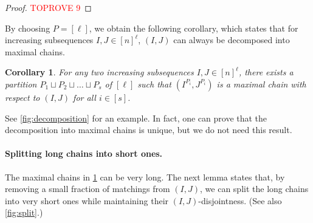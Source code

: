 \documentclass[11pt]{article}
\theoremstyle{plain}
\newtheorem{cor}[thm]{Corollary}
\theoremstyle{definition}
\theoremstyle{remark}
\begin{document}
\begin{proof}\textcolor{red}{TOPROVE 9}\end{proof}

By choosing $P=[\ell]$, we obtain the following corollary, which states that for increasing subsequences $I,J\in [n]^\ell$, $(I,J)$ can always be decomposed into maximal chains.

\begin{cor}\label{thm:structure}
For any two increasing subsequences $I,J\in[n]^{\ell}$, there exists a partition $P_1\sqcup P_2\sqcup \dots\sqcup P_s$ of $[\ell]$ such that $(I^{P_i},J^{P_i})$ is a maximal chain with respect to $(I,J)$ for all $i\in[s]$. 
\end{cor}

See \cref{fig:decomposition} for an example. In fact, one can prove that the decomposition into maximal chains is unique, but we do not need this result.









\paragraph{Splitting long chains into short ones.} 
The maximal chains in \cref{thm:structure} can be very long. The next lemma states that, by removing a small fraction of matchings from $(I,J)$, we can split the long chains into very short ones while maintaining their $(I,J)$-disjointness. (See also \cref{fig:split}.)
\end{document}
